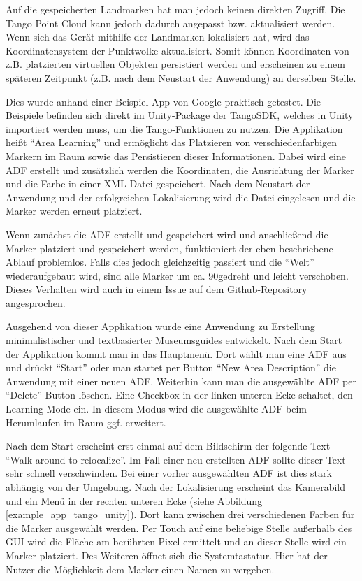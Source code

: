 Auf die gespeicherten Landmarken hat man jedoch keinen direkten Zugriff. Die Tango Point Cloud kann jedoch dadurch angepasst bzw. aktualisiert werden. Wenn sich das Gerät mithilfe der Landmarken lokalisiert hat, wird das Koordinatensystem der Punktwolke aktualisiert. Somit können Koordinaten von z.B. platzierten virtuellen Objekten persistiert werden und erscheinen zu einem späteren Zeitpunkt (z.B. nach dem Neustart der Anwendung) an derselben Stelle.

Dies wurde anhand einer Beispiel-App von Google praktisch getestet. Die Beispiele befinden sich direkt im Unity-Package der TangoSDK, welches in Unity importiert werden muss, um die Tango-Funktionen zu nutzen. Die Applikation heißt "`Area Learning"' und ermöglicht das Platzieren von verschiedenfarbigen Markern im Raum sowie das Persistieren dieser Informationen. Dabei wird eine ADF erstellt und zusätzlich werden die Koordinaten, die Ausrichtung der Marker und die Farbe in einer XML-Datei gespeichert. Nach dem Neustart der Anwendung und der erfolgreichen Lokalisierung wird die Datei eingelesen und die Marker werden erneut platziert.

Wenn zunächst die ADF erstellt und gespeichert wird und anschließend die Marker platziert und gespeichert werden, funktioniert der eben beschriebene Ablauf problemlos. Falls dies jedoch gleichzeitig passiert und die "`Welt"' wiederaufgebaut wird, sind alle Marker um ca. 90\degree gedreht und leicht verschoben. Dieses Verhalten wird auch in einem Issue auf dem Github-Repository angesprochen\cite{tango_unity_github_issue100}.

Ausgehend von dieser Applikation wurde eine Anwendung zu Erstellung minimalistischer und textbasierter Museumsguides entwickelt. Nach dem Start der Applikation kommt man in das Hauptmenü. Dort wählt man eine ADF aus und drückt "`Start"' oder man startet per Button "`New Area Description"' die Anwendung mit einer neuen ADF. Weiterhin kann man die ausgewählte ADF per "`Delete"'-Button löschen. Eine Checkbox in der linken unteren Ecke schaltet, den Learning Mode ein. In diesem Modus wird die ausgewählte ADF beim Herumlaufen im Raum ggf. erweitert.

Nach dem Start erscheint erst einmal auf dem Bildschirm der folgende Text "`Walk around to relocalize"'. Im Fall einer neu erstellten ADF sollte dieser Text sehr schnell verschwinden. Bei einer vorher ausgewählten ADF ist dies stark abhängig von der Umgebung. Nach der Lokalisierung erscheint das Kamerabild und ein Menü in der rechten unteren Ecke (siehe Abbildung \ref{example_app_tango_unity}). Dort kann zwischen drei verschiedenen Farben für die Marker ausgewählt werden. Per Touch auf eine beliebige Stelle außerhalb des GUI wird die Fläche am berührten Pixel ermittelt und an dieser Stelle wird ein Marker platziert. Des Weiteren öffnet sich die Systemtastatur. Hier hat der Nutzer die Möglichkeit dem Marker einen Namen zu vergeben.

